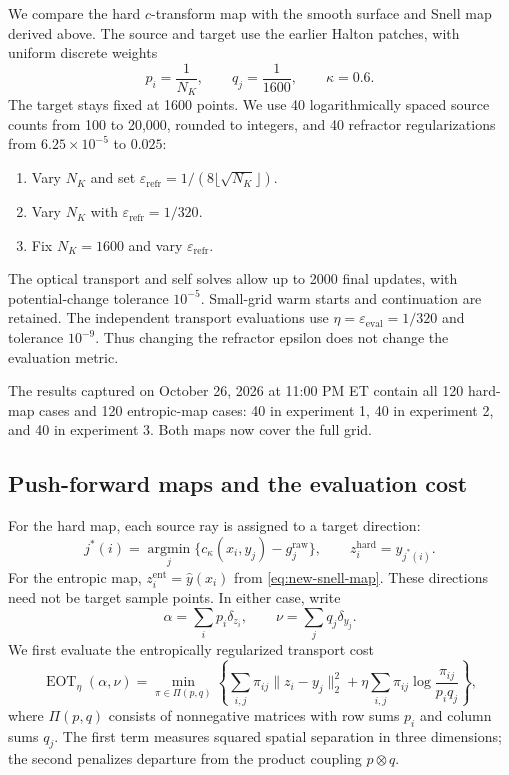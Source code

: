 We compare the hard $c$-transform map with the smooth surface and Snell
map derived above. The source and target use the earlier Halton patches,
with uniform discrete weights
\[
 p_i=\frac1{N_K},\qquad q_j=\frac1{1600},\qquad\kappa=0.6.
\]
The target stays fixed at 1600 points. We use 40 logarithmically spaced
source counts from 100 to 20,000, rounded to integers, and 40 refractor
regularizations from $6.25\times10^{-5}$ to $0.025$:
\begin{enumerate}
 \item Vary $N_K$ and set
 $\varepsilon_{\mathrm{refr}}=1/(8\lfloor\sqrt{N_K}\rfloor)$.
 \item Vary $N_K$ with $\varepsilon_{\mathrm{refr}}=1/320$.
 \item Fix $N_K=1600$ and vary $\varepsilon_{\mathrm{refr}}$.
\end{enumerate}
The optical transport and self solves allow up to 2000 final updates,
with potential-change tolerance $10^{-5}$. Small-grid warm starts and
continuation are retained. The independent transport evaluations use
$\eta=\varepsilon_{\mathrm{eval}}=1/320$ and tolerance $10^{-9}$.
Thus changing the refractor epsilon does not change the evaluation metric.

The results captured on October 26, 2026 at 11:00 PM ET contain all 120 hard-map cases and
120 entropic-map cases: 40 in experiment 1, 40 in
experiment 2, and 40 in experiment 3. Both maps now cover the full grid.

\subsection{Push-forward maps and the evaluation cost}

For the hard map, each source ray is assigned to a target direction:
\[
 j^*(i)=\underset{j}{\operatorname{argmin}}
 \{c_\kappa(x_i,y_j)-g_j^{\mathrm{raw}}\},\qquad
 z_i^{\mathrm{hard}}=y_{j^*(i)}.
\]
For the entropic map, $z_i^{\mathrm{ent}}=\widehat y(x_i)$ from
\eqref{eq:new-snell-map}. These directions need not be target sample
points. In either case, write
\[
 \alpha=\sum_i p_i\delta_{z_i},\qquad
 \nu=\sum_j q_j\delta_{y_j}.
\]
We first evaluate the entropically regularized transport cost
\begin{equation}
 \operatorname{EOT}_\eta(\alpha,\nu)
 =\min_{\pi\in\Pi(p,q)}\left\{
 \sum_{i,j}\pi_{ij}\|z_i-y_j\|_2^2
 +\eta\sum_{i,j}\pi_{ij}\log\frac{\pi_{ij}}{p_iq_j}\right\},
 \label{eq:new-eot-evaluation}
\end{equation}
where $\Pi(p,q)$ consists of nonnegative matrices with row sums $p_i$
and column sums $q_j$. The first term measures squared spatial
separation in three dimensions; the second penalizes departure from the
product coupling $p\otimes q$.

